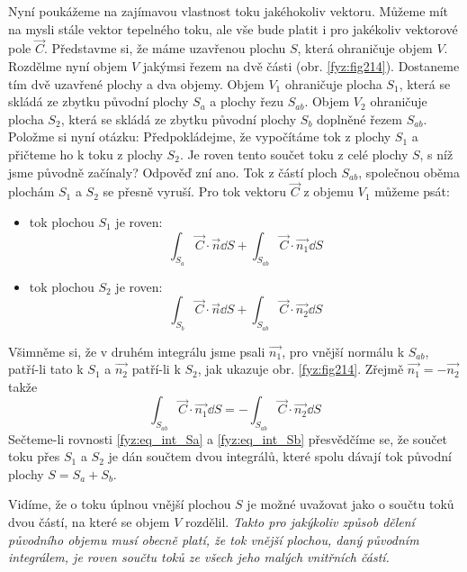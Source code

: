     Nyní poukážeme na zajímavou vlastnost toku jakéhokoliv vektoru. Můžeme mít na mysli stále 
    vektor tepelného toku, ale vše bude platit i pro jakékoliv vektorové pole $\vec{C}$. Představme 
    si, že máme uzavřenou plochu $S$, která ohraničuje objem $V$. Rozdělme nyní objem $V$ jakýmsi 
    řezem na dvě části (obr. \ref{fyz:fig214}). Dostaneme tím dvě uzavřené plochy a dva objemy. 
    Objem $V_1$ ohraničuje plocha $S_1$, která se skládá ze zbytku původní plochy $S_a$ a plochy 
    řezu $S_{ab}$. Objem $V_2$ ohraničuje plocha $S_2$, která se skládá ze zbytku původní plochy 
    $S_b$ doplněné řezem $S_{ab}$. Položme si nyní otázku: Předpokládejme, že vypočítáme tok z 
    plochy $S_1$ a přičteme ho k toku z plochy $S_2$. Je roven tento součet toku z celé plochy $S$, 
    s níž jsme původně začínaly? Odpověď zní ano. Tok z částí ploch $S_{ab}$, společnou oběma 
    plochám $S_1$ a $S_2$ se přesně vyruší. Pro tok vektoru $\vec{C}$ z objemu $V_1$ můžeme psát:
      
    \begin{itemize}
      \item tok plochou $S_1$ je roven:
        \begin{equation}\label{fyz:eq_int_Sa}
           \int_{S_a}\vec{C}\cdot\vec{n}\dd{S} + \int_{S_{ab}}\vec{C}\cdot\vec{n_1}\dd{S}
        \end{equation}
      \item tok plochou $S_2$ je roven:
         \begin{equation}\label{fyz:eq_int_Sb}
           \int_{S_b}\vec{C}\cdot\vec{n}\dd{S} + \int_{S_{ab}}\vec{C}\cdot\vec{n_2}\dd{S}
        \end{equation}
    \end{itemize} 
    Všimněme si, že v druhém integrálu jsme psali $\vec{n_1}$, pro vnější normálu k $S_{ab}$, 
    patří-li tato k $S_1$ a $\vec{n_2}$ patří-li k $S_2$, jak ukazuje obr. \ref{fyz:fig214}. 
    Zřejmě $\vec{n_1}= -\vec{n_2}$ takže
    \begin{equation}
    \int_{S_{ab}}\vec{C}\cdot\vec{n_1}\dd{S} = - \int_{S_{ab}}\vec{C}\cdot\vec{n_2}\dd{S}
    \end{equation}
    Sečteme-li rovnosti \ref{fyz:eq_int_Sa} a \ref{fyz:eq_int_Sb} přesvědčíme se, že součet toku 
    přes $S_1$ a $S_2$ je dán součtem dvou integrálů, které spolu dávají tok původní plochy $S = 
    S_a + S_b$.
    
    Vidíme, že o toku úplnou vnější plochou $S$ je možné uvažovat jako o součtu toků dvou částí, na 
    které se objem $V$ rozdělil. \emph{Takto pro jakýkoliv způsob dělení původního objemu musí 
    obecně platí, že tok vnější plochou, daný původním integrálem, je roven součtu toků ze všech 
    jeho malých vnitřních částí.} 
    
